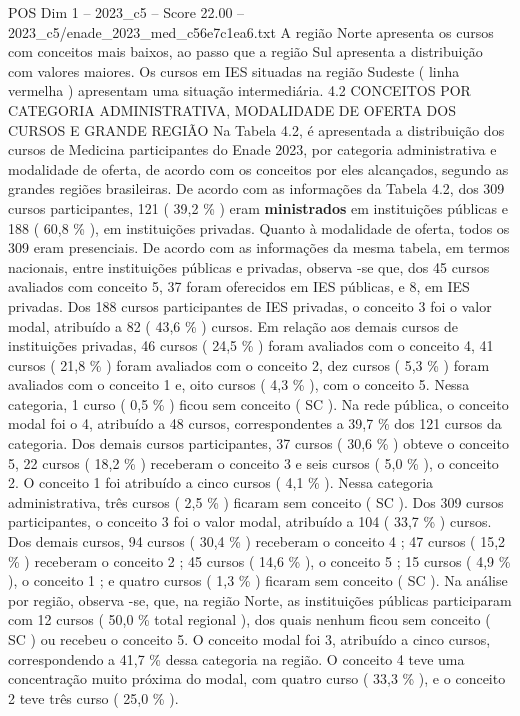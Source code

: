 \begin{textsample}{POS Dim 1 – 2023\_c5 – Score 22.00 – 2023\_c5/enade\_2023\_med\_c56e7c1ea6.txt}
A região Norte apresenta os cursos com conceitos mais baixos, ao passo que a região Sul apresenta a distribuição com valores maiores.
Os cursos em IES situadas na região Sudeste ( linha vermelha ) apresentam uma situação intermediária. 4.2 CONCEITOS POR CATEGORIA ADMINISTRATIVA, MODALIDADE DE OFERTA DOS CURSOS E GRANDE REGIÃO Na Tabela 4.2, é apresentada a distribuição dos cursos de Medicina participantes do Enade 2023, por categoria administrativa e modalidade de oferta, de acordo com os conceitos por eles alcançados, segundo as grandes regiões brasileiras.
De acordo com as informações da Tabela 4.2, dos 309 cursos participantes, 121 ( 39,2 \% ) eram \textbf{ministrados} em instituições públicas e 188 ( 60,8 \% ), em instituições privadas.
Quanto à modalidade de oferta, todos os 309 eram presenciais.
De acordo com as informações da mesma tabela, em termos nacionais, entre instituições públicas e privadas, observa -se que, dos 45 cursos avaliados com conceito 5, 37 foram oferecidos em IES públicas, e 8, em IES privadas.
Dos 188 cursos participantes de IES privadas, o conceito 3 foi o valor modal, atribuído a 82 ( 43,6 \% ) cursos.
Em relação aos demais cursos de instituições privadas, 46 cursos ( 24,5 \% ) foram avaliados com o conceito 4, 41 cursos ( 21,8 \% ) foram avaliados com o conceito 2, dez cursos ( 5,3 \% ) foram avaliados com o conceito 1 e, oito cursos ( 4,3 \% ), com o conceito 5.
Nessa categoria, 1 curso ( 0,5 \% ) ficou sem conceito ( SC ).
Na rede pública, o conceito modal foi o 4, atribuído a 48 cursos, correspondentes a 39,7 \% dos 121 cursos da categoria.
Dos demais cursos participantes, 37 cursos ( 30,6 \% ) obteve o conceito 5, 22 cursos ( 18,2 \% ) receberam o conceito 3 e seis cursos ( 5,0 \% ), o conceito 2.
O conceito 1 foi atribuído a cinco cursos ( 4,1 \% ).
Nessa categoria administrativa, três cursos ( 2,5 \% ) ficaram sem conceito ( SC ).
Dos 309 cursos participantes, o conceito 3 foi o valor modal, atribuído a 104 ( 33,7 \% ) cursos.
Dos demais cursos, 94 cursos ( 30,4 \% ) receberam o conceito 4 ; 47 cursos ( 15,2 \% ) receberam o conceito 2 ; 45 cursos ( 14,6 \% ), o conceito 5 ; 15 cursos ( 4,9 \% ), o conceito 1 ; e quatro cursos ( 1,3 \% ) ficaram sem conceito ( SC ).
Na análise por região, observa -se, que, na região Norte, as instituições públicas participaram com 12 cursos ( 50,0 \% total regional ), dos quais nenhum ficou sem conceito ( SC ) ou recebeu o conceito 5.
O conceito modal foi 3, atribuído a cinco cursos, correspondendo a 41,7 \% dessa categoria na região.
O conceito 4 teve uma concentração muito próxima do modal, com quatro curso ( 33,3 \% ), e o conceito 2 teve três curso ( 25,0 \% ).

\end{textsample}
